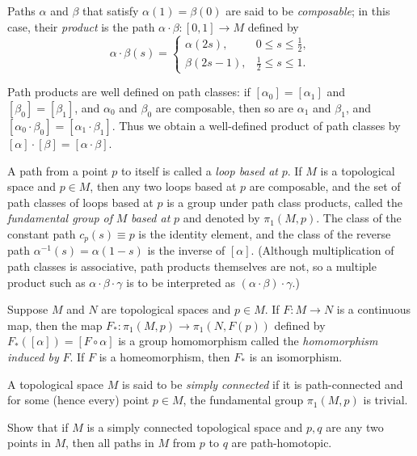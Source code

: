 Paths $\alpha$ and $\beta$ that satisfy $\alpha(1) = \beta(0)$ are said to be \emph{composable}; in this case,
their \emph{product} is the path $\alpha \cdot \beta : [0,1] \to M$ defined by
\[
\alpha \cdot \beta(s) = \begin{cases}
\alpha(2s), & 0 \le s \le \tfrac{1}{2}, \\
\beta(2s-1), & \tfrac{1}{2} \le s \le 1.
\end{cases}
\]

Path products are well defined on path classes: if $[\alpha_0] = [\alpha_1]$ and $[\beta_0] = [\beta_1]$, and
$\alpha_0$ and $\beta_0$ are composable, then so are $\alpha_1$ and $\beta_1$, and $[\alpha_0 \cdot \beta_0] = [\alpha_1 \cdot \beta_1]$. Thus we
obtain a well-defined product of path classes by $[\alpha] \cdot [\beta] = [\alpha \cdot \beta]$.

A path from a point $p$ to itself is called a \emph{loop based at} $p$. If $M$ is a topological
space and $p \in M$, then any two loops based at $p$ are composable, and the set of
path classes of loops based at $p$ is a group under path class products, called the
\emph{fundamental group of} $M$ \emph{based at} $p$ and denoted by $\pi_1(M, p)$. The class of the
constant path $c_p(s) \equiv p$ is the identity element, and the class of the reverse path
$\alpha^{-1}(s) = \alpha(1-s)$ is the inverse of $[\alpha]$. (Although multiplication of path classes is
associative, path products themselves are not, so a multiple product such as $\alpha \cdot \beta \cdot \gamma$
is to be interpreted as $(\alpha \cdot \beta) \cdot \gamma$.)

\begin{proposition}
\label{prop:induced-homomorphisms}
Suppose $M$ and $N$ are topological spaces and $p \in M$. If $F: M \to N$ is a continuous
map, then the map $F_*: \pi_1(M, p) \to \pi_1(N, F(p))$ defined by $F_*([\alpha]) = [F \circ \alpha]$
is a group homomorphism called the \emph{homomorphism induced by} $F$. If $F$ is a homeomorphism, then $F_*$ is an isomorphism.
\end{proposition}

A topological space $M$ is said to be \emph{simply connected} if it is path-connected and
for some (hence every) point $p \in M$, the fundamental group $\pi_1(M, p)$ is trivial.

\begin{exercise}
\label{exer:path-homotopy-simply-connected}
Show that if $M$ is a simply connected topological space and $p, q$ are any two points in $M$, then all paths in $M$ from $p$ to $q$ are path-homotopic.
\end{exercise}

